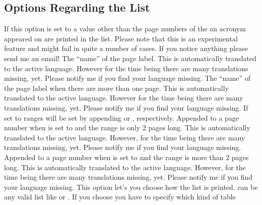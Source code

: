 \documentclass[DIV10,toc=index,toc=bib,hyperfootnotes=false]{cnpkgdoc}
\makeatletter
\providecommand*\sinceversion[1]{%
  \@bsphack
  \marginnote{%
    \footnotesize\sffamily\RaggedRight
    \textcolor{black!75}{Introduced in version~#1}}%
  \@esphack}
\makeatother
\begin{document}
\subsection{Options Regarding the List}
\begin{beschreibung}
   If this option is set to a value other than  the page numbers of
   the an acronym appeared on are printed in the list. Please note that this
   is an experimental feature and might fail in quite a number of cases. If you
   notice anything please send me an email!
   The ``name'' of the page label. This is automatically translated to the
   active language. However for the time being there are many translations
   missing, yet. Please notify me if you find your language missing.
   \sinceversion{1.0}The ``name'' of the page label when there are more than one
   page. This is automatically translated to the active language. However for the
   time being there are many translations missing, yet. Please notify me if you
   find your language missing.
   \sinceversion{1.0}If set to  ranges will be set by appending
    or , respectively.
   \sinceversion{1.0}Appended to a page number when  is set to
    and the range is only 2 pages long. This is automatically
   translated to the active language. However, for the time being there are many
   translations missing, yet. Please notify me if you find your language missing.
   \sinceversion{1.0}Appended to a page number when  is set to
    and the range is more than 2 pages long. This is automatically
   translated to the active language. However, for the time being there are many
   translations missing, yet. Please notify me if you find your language missing.
   This option let's you choose how the list is printed.  can be any
   valid list like
  or .
   If you choose  you have to specify which kind of table

\end{beschreibung}
\end{document}
